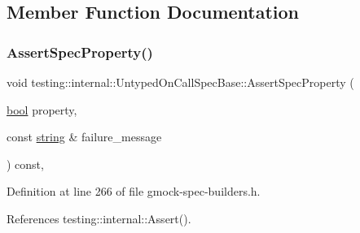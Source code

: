 \subsection{Member Function Documentation}
\mbox{\label{classtesting_1_1internal_1_1UntypedOnCallSpecBase_a83d223cf0e48fadc872a7b4062948df4}} 
\subsubsection{\texorpdfstring{Assert\+Spec\+Property()}{AssertSpecProperty()}}
{\footnotesize\ttfamily void testing\+::internal\+::\+Untyped\+On\+Call\+Spec\+Base\+::\+Assert\+Spec\+Property (\begin{DoxyParamCaption}\item[{\hyperlink{classbool}{bool}}]{property,  }\item[{const \hyperlink{namespacetesting_1_1internal_a8e8ff5b11e64078831112677156cb111}{string} \&}]{failure\+\_\+message }\end{DoxyParamCaption}) const\hspace{0.3cm}{\ttfamily [inline]}, {\ttfamily [protected]}}



Definition at line 266 of file gmock-\/spec-\/builders.\+h.



References testing\+::internal\+::\+Assert().


